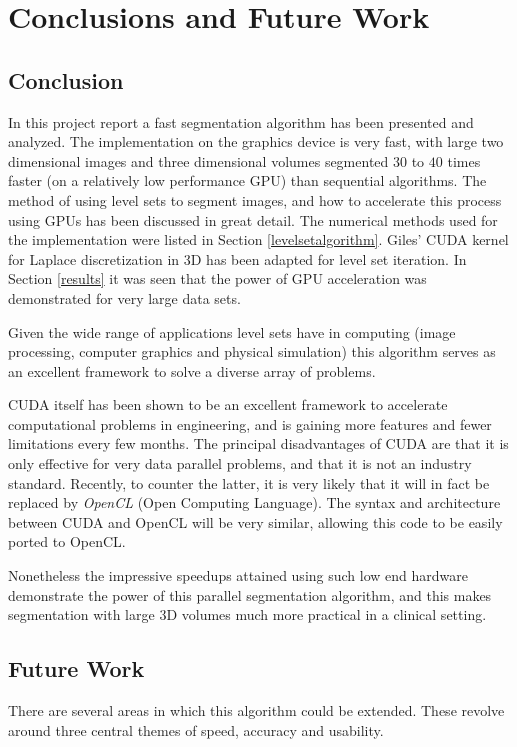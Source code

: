\chapter{Conclusions and Future Work}
\section{Conclusion}
In this project report a fast segmentation algorithm has been presented and analyzed. The implementation on the graphics device is very fast, with large two dimensional images and three dimensional volumes segmented $30$ to $40$ times faster (on a relatively low performance GPU) than sequential algorithms. 
The method of using level sets to segment images, and how to accelerate this process using GPUs has been discussed in great detail. The numerical methods used for the implementation were listed in Section \ref{levelsetalgorithm}. Giles' CUDA kernel for Laplace discretization in 3D \cite{mgiles} has been adapted for level set iteration. In Section \ref{results} it was seen that the power of GPU acceleration was demonstrated for very large data sets.

Given the wide range of applications level sets have in computing (image processing, computer graphics and physical simulation) this algorithm serves as an excellent framework to solve a diverse array of problems.
	
CUDA itself has been shown to be an excellent framework to accelerate computational problems in engineering, and is gaining more features and fewer limitations every few months. The principal disadvantages of CUDA are that it is only effective for very data parallel problems, and that it is not an industry standard. Recently, to counter the latter, it is very likely that it will in fact be replaced by \textit{OpenCL} (Open Computing Language). The syntax and architecture between CUDA and OpenCL will be very similar, allowing this code to be easily ported to OpenCL.

Nonetheless the impressive speedups attained using such low end hardware demonstrate the power of this parallel segmentation algorithm, and this makes segmentation with large 3D volumes much more practical in a clinical setting.

\section{Future Work}
There are several areas in which this algorithm could be extended. These revolve around three central themes of speed, accuracy and usability. 

